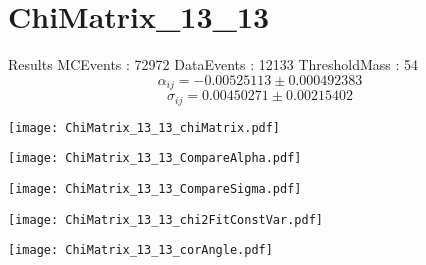 \documentclass[a4paper,12pt]{article}
\begin{document}
\section{ChiMatrix\_13\_13}
\begin{minipage}{0.49\linewidth} Results \newline
MCEvents : 72972\newline
DataEvents : 12133 \newline
ThresholdMass : 54\\
$$\alpha_{ij} = -0.00525113\pm 0.000492383$$
$$\sigma_{ij} = 0.00450271\pm 0.00215402$$
\end{minipage}\hfill
\begin{minipage}{0.49\linewidth} 
\texttt{[image: ChiMatrix\_13\_13\_chiMatrix.pdf]}\\
\end{minipage}
\hfill
\begin{minipage}{0.49\linewidth} 
\texttt{[image: ChiMatrix\_13\_13\_CompareAlpha.pdf]}\\
\end{minipage}
\hfill
\begin{minipage}{0.49\linewidth} 
\texttt{[image: ChiMatrix\_13\_13\_CompareSigma.pdf]}\\
\end{minipage}
\begin{minipage}{0.49\linewidth} 
\texttt{[image: ChiMatrix\_13\_13\_chi2FitConstVar.pdf]}\\
\end{minipage}
\hfill
\begin{minipage}{0.49\linewidth} 
\texttt{[image: ChiMatrix\_13\_13\_corAngle.pdf]}\\
\end{minipage}
\end{document}
